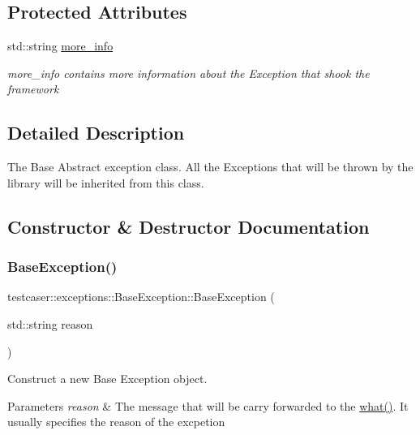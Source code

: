 \subsection*{Protected Attributes}
\begin{DoxyCompactItemize}
\item 
std\+::string \mbox{\hyperlink{classtestcaser_1_1exceptions_1_1BaseException_abfc26d4451ae832886c32ad2e283104e}{more\+\_\+info}}
\begin{DoxyCompactList}\small\item\em more\+\_\+info contains more information about the Exception that shook the framework \end{DoxyCompactList}\end{DoxyCompactItemize}


\subsection{Detailed Description}
The Base Abstract exception class. All the Exceptions that will be thrown by the library will be inherited from this class. 



\subsection{Constructor \& Destructor Documentation}
\mbox{\label{classtestcaser_1_1exceptions_1_1BaseException_a70b5f42e6197e2600f7163f843060af2}} 
\subsubsection{\texorpdfstring{BaseException()}{BaseException()}}
{\footnotesize\ttfamily testcaser\+::exceptions\+::\+Base\+Exception\+::\+Base\+Exception (\begin{DoxyParamCaption}\item[{std\+::string}]{reason }\end{DoxyParamCaption})\hspace{0.3cm}{\ttfamily [inline]}}



Construct a new Base Exception object. 


\begin{DoxyParams}{Parameters}
{\em reason} & The message that will be carry forwarded to the \mbox{\hyperlink{classtestcaser_1_1exceptions_1_1BaseException_a76d41683a93c7c45cd446ee161344f05}{what()}}. It usually specifies the reason of the excpetion \\
\hline
\end{DoxyParams}


